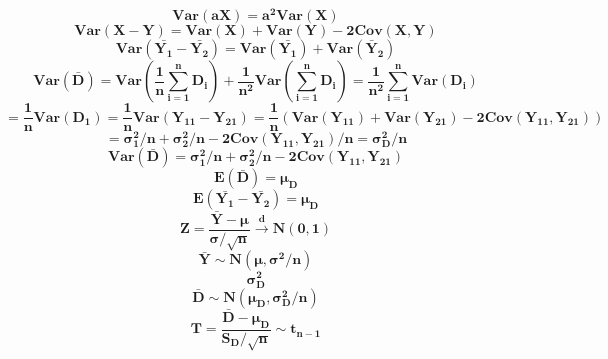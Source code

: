 \documentclass[12pt,portrait,semhelv,semrot]{article}
\begin{document}
{{$$\boldsymbol{Var(aX) = a^2 Var(X)}$$
$$\boldsymbol{Var(X-Y) = Var(X) + Var(Y) -2Cov(X,Y)}$$
$$\boldsymbol{Var\left(\bar{Y_1}-\bar{Y_2}\right) = Var\left(\bar{Y_1}\right) + Var\left(\bar{Y}_2\right)}$$
$$\boldsymbol{Var\left(\bar{D}\right) = Var\left(\frac{1}{n}\sum_{i=1}^{n}D_i\right) + \frac{1}{n^2}Var\left(\sum_{i=1}^{n}D_i\right)= \frac{1}{n^2}\sum_{i=1}^{n}Var(D_i)}$$
$$\boldsymbol{ = \frac{1}{n}Var(D_1) = \frac{1}{n}Var(Y_{11}-Y_{21}) = \frac{1}{n}\left(Var(Y_{11})+Var(Y_{21}) -2Cov(Y_{11}, Y_{21})\right)}$$
$$\boldsymbol{ = \sigma^2_1/n+\sigma^2_2/n-2Cov(Y_{11},Y_{21})/n = \sigma^2_D/n}$$
$$\boldsymbol{Var\left(\bar{D}\right) = \sigma^2_1/n+\sigma^2_2/n-2Cov(Y_{11},Y_{21})}$$
$$\boldsymbol{E\left(\bar{D}\right) = \mu_D}$$
$$\boldsymbol{E\left(\bar{Y_1}-\bar{Y_2}\right) = \mu_D}$$
$$\boldsymbol{Z = \frac{\bar{Y}-\mu}{\sigma/\sqrt{n}}\stackrel{d}\rightarrow N(0, 1)}$$
$$\boldsymbol{\bar{Y}\sim N(\mu, \sigma^2/n)}$$
$$\boldsymbol{\sigma^2_D}$$
$$\boldsymbol{\bar{D}\sim N(\mu_D, \sigma_D^2/n)}$$
$$\boldsymbol{T = \frac{\bar{D}-\mu_D}{S_D/\sqrt{n}}\sim t_{n-1}}$$
}
}
\end{document}
